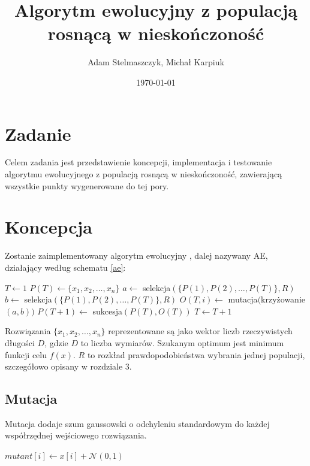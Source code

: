\documentclass[12pt, a4paper]{article}
\title{\textbf{Algorytm ewolucyjny z populacją rosnącą w nieskończoność}}
\author{Adam Stelmaszczyk, Michał Karpiuk}
\date{\today}
\begin{document}
\maketitle

\section{Zadanie}

Celem zadania jest przedstawienie koncepcji, implementacja i testowanie algorytmu ewolucyjnego z populacją rosnącą
w nieskończoność, zawierającą wszystkie punkty wygenerowane do tej pory.

\section{Koncepcja}

Zostanie zaimplementowany algorytm ewolucyjny \cite{jarabas}, dalej nazywany AE, 
działający według schematu \ref{ae}:

\begin{algorithm}[H]
\label{ae}
\begin{algorithmic}[1]
  \State $T \gets 1$
  \State $P(T) \gets \{x_1, x_2, \ldots, x_n\}$
      \State $a \gets$ selekcja$(\{P(1), P(2), \dots, P(T)\}, R)$
      \State $b \gets$ selekcja$(\{P(1), P(2), \dots, P(T)\}, R)$
      \State $O(T,i) \gets$ mutacja$($krzy{\.z}owanie$(a, b))$
    \EndFor
    \State $P(T+1) \gets$ sukcesja$(P(T), O(T))$
    \State $T \gets T+1$
  \EndWhile
\EndFunction
\end{algorithmic}
\end{algorithm}

Rozwiązania $\{x_1, x_2, \ldots, x_n\}$ reprezentowane są jako wektor liczb rzeczywistych długości $D$,
gdzie $D$ to liczba wymiarów. Szukanym optimum jest minimum funkcji celu $f(x)$. $R$ to rozkład prawdopodobieństwa
wybrania jednej populacji, szczegółowo opisany w rozdziale 3.

\subsection{Mutacja}

Mutacja dodaje szum gaussowski o odchyleniu standardowym do każdej współrzędnej wejściowego rozwiązania.

\begin{algorithm}[H]
\begin{algorithmic}[1]
    \State $mutant[i] \gets x[i] + \mathcal{N}(0, 1)$
  \EndFor
\EndFunction
\end{algorithmic}
\end{algorithm}
\end{document}
